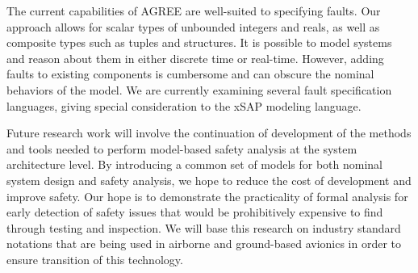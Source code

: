 The current capabilities of AGREE are well-suited to specifying faults.  Our approach allows for scalar types of unbounded integers and reals, as well as composite types such as tuples and structures.  It is possible to model systems and reason about them in either discrete time or real-time.  However, adding faults to existing components is cumbersome and can obscure the nominal behaviors of the model.  We are currently examining several fault specification languages, giving special consideration to the xSAP modeling language.

Future research work will involve the continuation of development of the methods and tools needed to perform model-based safety analysis at the system architecture level. By introducing a common set of models for both nominal system design and safety analysis, we hope to reduce the cost of development and improve safety. Our hope is to demonstrate the practicality of formal analysis for early detection of safety issues that would be prohibitively expensive to find through testing and inspection. We will base this research on industry standard notations that are being used in airborne and ground-based avionics in order to ensure transition of this technology.




